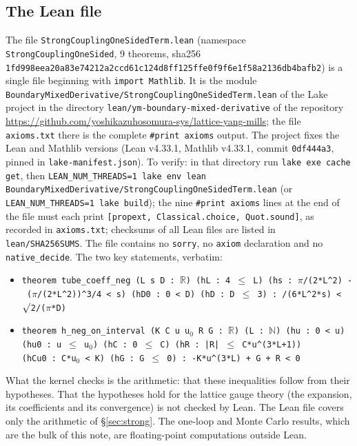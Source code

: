 \documentclass[11pt,a4paper]{article}
\theoremstyle{definition}
\theoremstyle{remark}
\begin{document}
\subsection{The Lean file}

{\sloppy The file \texttt{StrongCouplingOneSidedTerm.lean} (namespace \texttt{StrongCouplingOneSided}, 9 theorems, sha256 \texttt{1fd998ee\allowbreak{}a20a83e7\allowbreak{}4212a2cc\allowbreak{}d61c124d\allowbreak{}8ff125ff\allowbreak{}e0f9f6e1\allowbreak{}f58a2136\allowbreak{}db4bafb2}) is a single file beginning with \texttt{import Mathlib}. It is the module \texttt{BoundaryMixedDerivative/StrongCouplingOneSidedTerm.lean} of the Lake project in the directory \texttt{lean/ym-boundary-mixed-derivative} of the repository \url{https://github.com/yoshikazuhosomura-sys/lattice-yang-mills}; the file \texttt{axioms.txt} there is the complete \texttt{\#print axioms} output. The project fixes the Lean and Mathlib versions (Lean v4.33.1, Mathlib v4.33.1, commit \texttt{0df444a3}, pinned in \texttt{lake-manifest.json}). To verify: in that directory run \texttt{lake exe cache get}, then \texttt{LEAN\_NUM\_THREADS=1 lake env lean BoundaryMixedDerivative/StrongCouplingOneSidedTerm.lean} (or \texttt{LEAN\_NUM\_THREADS=1 lake build}); the nine \texttt{\#print axioms} lines at the end of the file must each print \texttt{[propext, Classical.choice, Quot.sound]}, as recorded in \texttt{axioms.txt}; checksums of all Lean files are listed in \texttt{lean/SHA256SUMS}. The file contains no \texttt{sorry}, no \texttt{axiom} declaration and no \texttt{native\_decide}. The two key statements, verbatim:\par}
\begin{itemize}[leftmargin=2em]\raggedright
\item \texttt{theorem~tube\_coeff\_neg \allowbreak (L~s~D~:~\ensuremath{\mathbb{R}}) \allowbreak (hL~:~4~\ensuremath{\le}~L) \allowbreak (hs~:~\ensuremath{\pi}/(2*L\^{}2)~-~(\ensuremath{\pi}/(2*L\^{}2))\^{}3/4~<~s) \allowbreak (hD0~:~0~<~D) \allowbreak (hD~:~D~\ensuremath{\le}~3)~: /(6*L\^{}2*s)~<~\ensuremath{\surd}2/(\ensuremath{\pi}*D)}
\item \texttt{theorem~h\_neg\_on\_interval \allowbreak (K~C~u~u\ensuremath{_0}~R~G~:~\ensuremath{\mathbb{R}}) \allowbreak (L~:~\ensuremath{\mathbb{N}}) \allowbreak (hu~:~0~<~u) \allowbreak (hu0~:~u~\ensuremath{\le}~u\ensuremath{_0}) \allowbreak (hC~:~0~\ensuremath{\le}~C) \allowbreak (hR~:~|R|~\ensuremath{\le}~C*u\^{}(3*L+1)) \allowbreak (hCu0~:~C*u\ensuremath{_0}~<~K) \allowbreak (hG~:~G~\ensuremath{\le}~0)~: \allowbreak -K*u\^{}(3*L)~+~G~+~R~<~0}
\end{itemize}
What the kernel checks is the arithmetic: that these inequalities follow from their hypotheses. That the hypotheses hold for the lattice gauge theory (the expansion, its coefficients and its convergence) is not checked by Lean. The Lean file covers only the arithmetic of \S\ref{sec:strong}. The one-loop and Monte Carlo results, which are the bulk of this note, are floating-point computations outside Lean.
\end{document}
